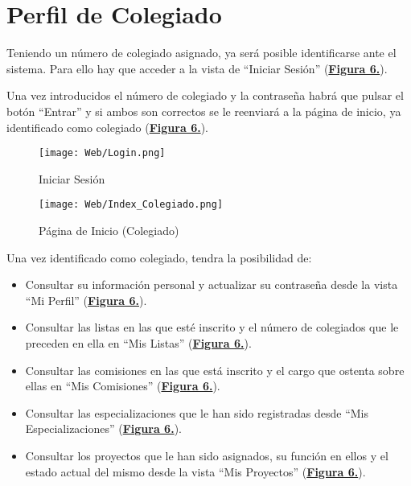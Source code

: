 \section{Perfil de Colegiado}
\addtocounter{figura_manual}{1} Teniendo un número de colegiado asignado, ya será posible identificarse ante el sistema. Para ello hay que acceder a la vista de ``Iniciar Sesión'' (\textbf{\hyperref[fig:Web_Login]{Figura 6.}}).\addtocounter{figura_manual}{1} Una vez introducidos el número de colegiado y la contraseña habrá que pulsar el botón ``Entrar'' y si ambos son correctos se le reenviará a la página de inicio, ya identificado como colegiado (\textbf{\hyperref[fig:Web_Index_Colegiado]{Figura 6.}}).
\begin{figure}[!htbp]
  \centering
  \texttt{[image: Web/Login.png]}
  \caption{Iniciar Sesión}
  \label{fig:Web_Login}
\end{figure}
\FloatBarrier

\begin{figure}[!htbp]
  \centering
  \texttt{[image: Web/Index\_Colegiado.png]}
  \caption{Página de Inicio (Colegiado)}
  \label{fig:Web_Index_Colegiado}
\end{figure}
\FloatBarrier

Una vez identificado como colegiado, tendra la posibilidad de:
\begin{itemize}
  \item \addtocounter{figura_manual}{1} Consultar su información personal y actualizar su contraseña desde la vista ``Mi Perfil'' (\textbf{\hyperref[fig:Web_Coleg_MiPerfil]{Figura 6.}}).
  \item \addtocounter{figura_manual}{1} Consultar las listas en las que esté inscrito y el número de colegiados que le preceden en ella en ``Mis Listas'' (\textbf{\hyperref[fig:Web_Coleg_MisListas]{Figura 6.}}).
  \item \addtocounter{figura_manual}{1} Consultar las comisiones en las que está inscrito y el cargo que ostenta sobre ellas en ``Mis Comisiones'' (\textbf{\hyperref[fig:Web_Coleg_MisComisiones]{Figura 6.}}).
  \item \addtocounter{figura_manual}{1} Consultar las especializaciones que le han sido registradas desde ``Mis Especializaciones'' (\textbf{\hyperref[fig:Web_Coleg_MisEspecializaciones]{Figura 6.}}).
  \item \addtocounter{figura_manual}{1} Consultar los proyectos que le han sido asignados, su función en ellos y el estado actual del mismo desde la vista ``Mis Proyectos'' (\textbf{\hyperref[fig:Web_Coleg_MisProyectos]{Figura 6.}}).
\end{itemize}

